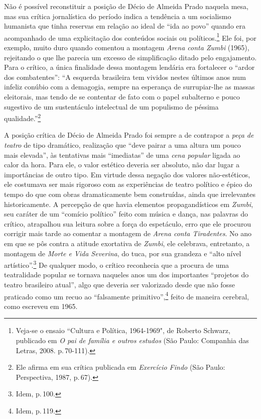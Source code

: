 Não é possível reconstituir a posição de Décio de Almeida Prado naquela
mesa, mas sua crítica jornalística do período indica a tendência a um
socialismo humanista que tinha reservas em relação ao ideal de “ida ao
povo” quando era acompanhado de uma explicitação dos conteúdos sociais
ou políticos.\footnote{Veja-se o ensaio “Cultura e Política, 1964-1969",
  de Roberto Schwarz, publicado em {\it O pai de família e outros
  estudos} (São Paulo: Companhia das Letras, 2008. p.\,70-111).} Ele foi,
por exemplo, muito duro quando comentou a montagem {\it Arena conta
Zumbi} (1965), rejeitando o que lhe parecia um excesso de simplificação
ditado pelo engajamento. Para o crítico, a única finalidade dessa
montagem lendária era fortalecer o “ardor dos combatentes”: “A esquerda
brasileira tem vividos nestes últimos anos num infeliz conúbio com a
demagogia, sempre na esperança de surrupiar-lhe as massas eleitorais,
mas tendo de se contentar de fato com o papel subalterno e pouco
sugestivo de um sustentáculo intelectual de um populismo de péssima
qualidade.”\footnote{Ele afirma em sua crítica publicada em
  {\it Exercício Findo} (São Paulo: Perspectiva, 1987, p.\,67).}

A posição crítica de Décio de Almeida Prado foi sempre a de contrapor a
{\it peça de teatro} de tipo dramático, realização que “deve pairar a
uma altura um pouco mais elevada”, às tentativas mais “imediatas” de uma
{\it cena popular} ligada ao calor da hora. Para ele, o valor estético
deveria ser absoluto, não dar lugar a importâncias de outro tipo. Em
virtude dessa negação dos valores não-estéticos, ele costumava ser mais
rigoroso com as experiências de teatro político e épico do tempo do que
com obras dramaticamente bem construídas, ainda que irrelevantes
historicamente. A percepção de que havia elementos propagandísticos em
{\it Zumbi}, seu caráter de um “comício político” feito com música e
dança, nas palavras do crítico, atrapalhou sua leitura sobre a força do
espetáculo, erro que ele procurou corrigir mais tarde ao comentar a
montagem de {\it Arena conta Tiradentes}. No ano em que se pôs contra a
atitude exortativa de {\it Zumbi}, ele celebrava, entretanto, a montagem
de {\it Morte e Vida Severina}, do {\sc tuca}, por sua grandeza e “alto nível
artístico”.\footnote{Idem, p.\,100.} De qualquer modo, o crítico
reconhecia que a procura de uma teatralidade popular se tornava naqueles
anos um dos importantes “projetos do teatro brasileiro atual”, algo que
deveria ser valorizado desde que não fosse praticado como um recuo ao
“falsamente primitivo”,\footnote{Idem, p.\,119.} feito de maneira
cerebral, como escreveu em 1965.

